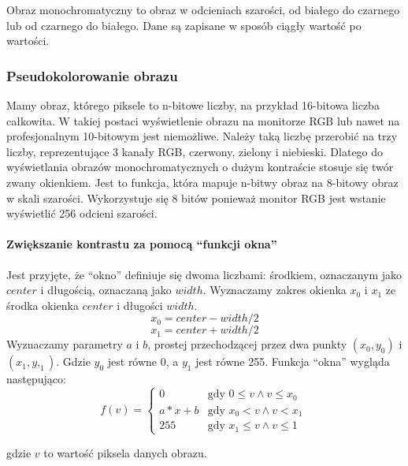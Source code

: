 \label{sec:algorithm-pixmap-monochrome}

Obraz monochromatyczny to obraz w odcieniach szarości, od białego do czarnego lub od czarnego do białego. Dane są zapisane w sposób ciągły wartość po wartości.

\subsubsection{Pseudokolorowanie obrazu}

Mamy obraz, którego piksele to n-bitowe liczby, na przykład 16-bitowa liczba całkowita.
W takiej postaci wyświetlenie obrazu na monitorze RGB lub nawet na profesjonalnym 10-bitowym jest niemożliwe.
Należy taką liczbę przerobić na trzy liczby, reprezentujące 3 kanały RGB, czerwony, zielony i niebieski.
Dlatego do wyświetlania obrazów monochromatycznych o dużym kontraście stosuje się twór zwany okienkiem.
Jest to funkcja, która mapuje n-bitwy obraz na 8-bitowy obraz w skali szarości.
Wykorzystuje się 8 bitów ponieważ monitor RGB jest wstanie wyświetlić 256 odcieni szarości.

\paragraph*{Zwiększanie kontrastu za pomocą \enquote{funkcji okna}}
Jest przyjęte, że \enquote{okno} definiuje się dwoma liczbami: środkiem, oznaczanym jako $center$ i długością, oznaczaną jako $width$.
Wyznaczamy zakres okienka $x_0$ i $x_1$ ze środka okienka $center$ i długości $width$.
\[x_0 = center - width / 2\]
\[x_1 = center + width / 2\]
Wyznaczamy parametry $a$ i $b$, prostej przechodzącej przez dwa punkty $(x_0, y_0)$ i $(x_1, y,_1)$.
Gdzie $y_0$ jest równe 0, a $y_1$ jest równe 255.
Funkcja \enquote{okna} wygląda następująco:
\[
    f(v)=
    \begin{cases}
        0     & \text{gdy $0 \le v \wedge v \le x_0$ } \\
        a*x+b & \text{gdy $x_0 < v \wedge v < x_1$}    \\
        255   & \text{gdy $x_1 \le v \wedge v \le 1$ }
    \end{cases}
\]

gdzie $v$ to wartość piksela danych obrazu.

